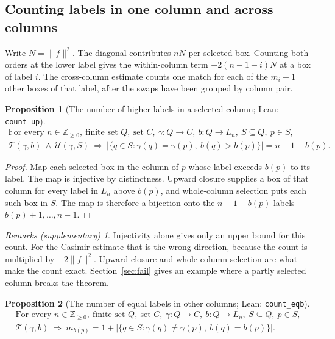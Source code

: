 \documentclass[11pt]{amsart}
\newcommand{\lean}[1]{\texttt{#1}}
\newcommand{\notlean}{supplementary}
\newtheorem{proposition}{Proposition}
\theoremstyle{definition}
\theoremstyle{remark}
\newtheorem*{remarks}{Remarks \textup{(\notlean)}}
\begin{document}
\subsection{Counting labels in one column and across columns}

Write \(N=\|f\|^2\). The diagonal contributes \(nN\) per selected box.
Counting both orders at the lower label gives the within-column term
\(-2(n-1-i)N\) at a box of label \(i\). The cross-column estimate counts
one match for each of the \(m_i-1\) other boxes of that label, after the
swaps have been grouped by column pair.

\begin{proposition}[The number of higher labels in a selected column; Lean: \lean{count\_\allowbreak{}up}]\label{prop:4}
\[
\begin{gathered}
\text{For every }n\in\mathbb Z_{\ge0},\ \text{finite set }Q,\ \text{set }C,\
\gamma:Q\to C,\ b:Q\to L_n,\ S\subseteq Q,\ p\in S,\\
\mathcal T(\gamma,b)\ \land\ \mathcal U(\gamma,S)
\ \Longrightarrow\
|\{q\in S:\gamma(q)=\gamma(p),\ b(q)>b(p)\}|=n-1-b(p).
\end{gathered}
\]
\end{proposition}

\begin{proof}
Map each selected box in the column of \(p\) whose label exceeds \(b(p)\) to
its label. The map is injective by distinctness. Upward closure supplies a
box of that column for every label in \(L_n\) above \(b(p)\), and
whole-column selection puts each such box in \(S\). The map is therefore a
bijection onto the \(n-1-b(p)\) labels \(b(p)+1,\ldots,n-1\).
\end{proof}

\begin{remarks}
Injectivity alone gives only an upper bound for this count. For the Casimir
estimate that is the wrong direction, because the count is multiplied by
\(-2\|f\|^2\). Upward closure and whole-column selection are what make the
count exact. Section~\ref{sec:fail} gives an example where a partly selected
column breaks the theorem.
\end{remarks}

\begin{proposition}[The number of equal labels in other columns; Lean: \lean{count\_\allowbreak{}eqb}]\label{prop:5}
\[
\begin{gathered}
\text{For every }n\in\mathbb Z_{\ge0},\ \text{finite set }Q,\ \text{set }C,\
\gamma:Q\to C,\ b:Q\to L_n,\ S\subseteq Q,\ p\in S,\\
\mathcal T(\gamma,b)
\ \Longrightarrow\
m_{b(p)}=1+|\{q\in S:\gamma(q)\ne\gamma(p),\ b(q)=b(p)\}|.
\end{gathered}
\]
\end{proposition}
\end{document}

